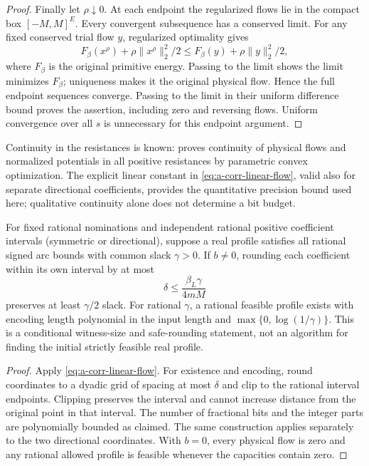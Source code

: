 \begin{proof}
Finally let $\rho\downarrow0$. At each endpoint the regularized flows
lie in the compact box $[-M,M]^E$. Every convergent subsequence has a
conserved limit. For any fixed conserved trial flow $y$, regularized
optimality gives
\[
 F_\beta(x^\rho)+\rho\|x^\rho\|_2^2/2
 \le F_\beta(y)+\rho\|y\|_2^2/2,
\]
where $F_\beta$ is the original primitive energy. Passing to the limit
shows the limit minimizes $F_\beta$; uniqueness makes it the original
physical flow. Hence the full endpoint sequences converge. Passing to
the limit in their uniform difference bound proves the assertion,
including zero and reversing flows. Uniform convergence over all $s$
is unnecessary for this endpoint argument.
\end{proof}

Continuity in the resistances is known:
\citet[Theorem 3.12, pp.~34--35]{raber2022-thesis} proves continuity
of physical flows and normalized potentials in all positive resistances
by parametric convex optimization. The explicit linear constant in
\cref{eq:a-corr-linear-flow}, valid also for separate directional
coefficients, provides the quantitative precision bound used here;
qualitative continuity alone does not determine a bit budget.

\begin{corollary}
\label{cor:a-corr-strict-margin}
For fixed rational nominations and independent rational positive
coefficient intervals (symmetric or directional), suppose a real profile
satisfies all rational signed arc bounds with common slack $\gamma>0$.
If $b\ne0$, rounding each coefficient within its own interval by at most
\[
 \delta\le\frac{\beta_L\gamma}{4mM}
\]
preserves at least $\gamma/2$ slack. For rational $\gamma$, a rational
feasible profile exists with encoding length polynomial in the input
length and $\max\{0,\log(1/\gamma)\}$. This is a conditional witness-size
and safe-rounding statement, not an algorithm for finding the initial
strictly feasible real profile.
\end{corollary}
\begin{proof}
Apply \cref{eq:a-corr-linear-flow}. For existence and encoding, round
coordinates to a dyadic grid of spacing at most $\delta$ and clip to the
rational interval endpoints. Clipping preserves the interval and cannot
increase distance from the original point in that interval. The number
of fractional bits and the integer parts are polynomially bounded as
claimed. The same construction applies separately to the two directional
coordinates. With $b=0$, every physical flow is zero and any rational
allowed profile is feasible whenever the capacities contain zero.
\end{proof}

